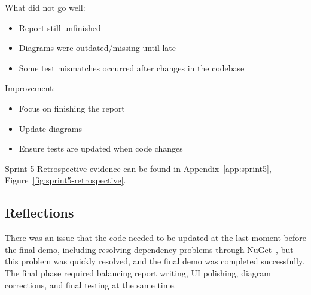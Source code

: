What did not go well:

\begin{itemize}

    \item Report still unfinished

    \item Diagrams were outdated/missing until late

    \item Some test mismatches occurred after changes in the codebase

\end{itemize}



Improvement:

\begin{itemize}

    \item Focus on finishing the report

    \item Update diagrams

    \item Ensure tests are updated when code changes

\end{itemize}

Sprint 5 Retrospective evidence can be found in Appendix~\ref{app:sprint5}, Figure~\ref{fig:sprint5-retrospective}.
 

\subsection*{Reflections}

There was an issue that the code needed to be updated at the last moment before the final demo, including resolving dependency problems through NuGet~\cite{nuget}, but this problem was quickly resolved, and the final demo was completed successfully. The final phase required balancing report writing, UI polishing, diagram corrections, and final testing at the same time.
